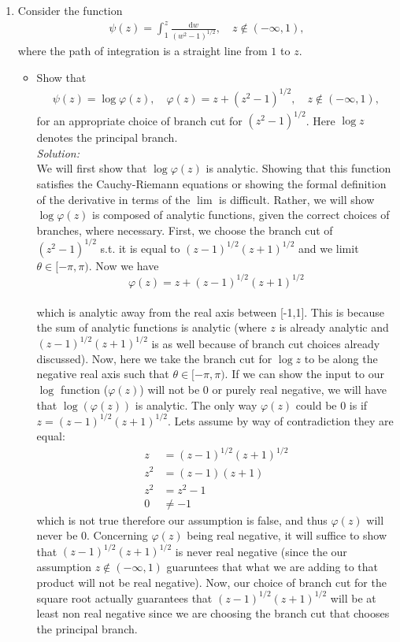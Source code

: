 \documentclass[10pt]{amsart}
\newcommand{\D}{\mathrm{d}}
\theoremstyle{nonumberplain}
\begin{document}
\begin{enumerate}[label={\bf {\arabic*}:}]
  \item Consider the function
    \begin{align*}
     \psi(z) = \int_1^z \frac{\D w}{(w^2 - 1)^{1/2}}, \quad z \not \in
      (-\infty, 1),
    \end{align*}
    where the path of integration is a straight line from $1$ to $z$.
    \begin{itemize}
   \item  Show that
    \begin{align*}
      \psi(z) = \log \varphi(z), \quad \varphi(z) = z + (z^2 -
      1)^{1/2}, \quad z \not \in
      (-\infty, 1),
    \end{align*}
   for an appropriate choice of branch cut for $(z^2 -
   1)^{1/2}$.  Here $\log z$ denotes the principal branch. \\
   \textit{Solution:} \\
   We will first show that $\log \varphi(z)$ is analytic.
   Showing that this function satisfies the Cauchy-Riemann equations or showing the formal definition of the derivative in terms of the $\lim$ is difficult. 
   Rather, we will show $\log \varphi(z)$ is composed of analytic functions, given the correct choices of branches, where necessary.
   First, we choose the branch cut of $(z^2 - 1)^{1/2}$ s.t. it is equal to $(z - 1)^{1/2} (z + 1)^{1/2}$ and we limit $\theta \in [-\pi, \pi)$.
   Now we have \\
   $$\varphi(z) = z + (z - 1)^{1/2}(z + 1)^{1/2}$$ \\
   which is analytic away from the real axis between [-1,1]. This is because the sum of analytic functions is analytic (where $z$ is already analytic and $(z - 1)^{1/2}(z + 1)^{1/2}$ is as well because of branch cut choices already discussed). Now, here we take the branch cut for $\log z$ to be along the negative real axis such that $\theta \in [-\pi, \pi)$. If we can show the input to our $\log$ function ($\varphi(z)$) will not be 0 or purely real negative, we will have that $\log(\varphi(z))$ is analytic. The only way $\varphi(z)$ could be 0 is if $z = (z - 1)^{1/2}(z + 1)^{1/2}$. Lets assume by way of contradiction they are equal:
   \begin{align*}
   z &= (z - 1)^{1/2}(z + 1)^{1/2} \\
   z^2 &= (z - 1)(z + 1) \\
   z^2 &= z^2 - 1 \\
   0 &\neq - 1
   \end{align*}
   which is not true therefore our assumption is false, and thus $\varphi(z)$ will never be 0.
   Concerning $\varphi(z)$ being real negative, it will suffice to show that $(z - 1)^{1/2}(z + 1)^{1/2}$ is never real negative (since the our assumption $z \not \in (-\infty, 1)$ guaruntees that what we are adding to that product will not be real negative).
   Now, our choice of branch cut for the square root actually guarantees that $(z - 1)^{1/2}(z + 1)^{1/2}$ will be at least non real negative since we are choosing the branch cut that chooses the principal branch.
   

\end{itemize}
\end{enumerate}
\end{document}
